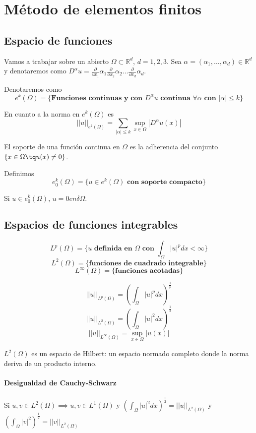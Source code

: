 \newpage
\section{Método de elementos finitos}

\subsection{Espacio de funciones}
Vamos a trabajar sobre un abierto $\Omega\subset\mathbb{R}^d$, $d=1,2,3$.
Sea $\alpha = (\alpha_1,\hdots,\alpha_d)\in\mathbb{R}^d$ y denotaremos como $D^\alpha u=\frac{\partial}{\partial x_1}\alpha_1\frac{\partial}{\partial x_2}\alpha_2\hdots\frac{\partial}{\partial x_d}\alpha_d$.

Denotaremos como 
$$e^k(\Omega) = \{\textbf{Funciones continuas y con } D^\alpha u \textbf{ continua } \forall\alpha\textbf{ con }|\alpha|\le k\}$$

En cuanto a la norma en $e^k(\Omega)$ es
$$||u||_{e^k(\Omega)} = \sum_{|\alpha|\le k}\sup_{x\in\Omega}|D^\alpha u(x)|$$

El soporte de una función continua en $\Omega$ es la adherencia del conjunto $\{x\in\Omega \tq u(x) \neq 0\}$.

Definimos
$$e_0^k (\Omega)= \{u\in e^k(\Omega) \textbf{ con soporte compacto}\}$$

Si $u\in e_0^k(\Omega)$, $u=0 en \delta\Omega$.

\subsection{Espacios de funciones integrables}
$$L^p(\Omega) = \{u\textbf{ definida en }\Omega \textbf{ con }\int_\Omega |u|^p dx < \infty \}$$
$$L^2(\Omega)=\{\textbf{funciones de cuadrado integrable}\}$$
$$L^\infty (\Omega) =\{\textbf{funciones acotadas}\}$$

$$||u||_{L^p(\Omega)} = (\int_{\Omega}|u|^p dx)^\frac{1}{p}$$
$$||u||_{L^2(\Omega)} = (\int_{\Omega}|u|^2 dx)^\frac{1}{2}$$
$$||u||_{L^\infty(\Omega)} = \sup_{x\in\Omega}|u(x)|$$

$L^2(\Omega)$ es un espacio de Hilbert: un espacio normado completo donde la norma deriva de un producto interno.

\paragraph{Desigualdad de Cauchy-Schwarz}
Si $u,v\in L^2(\Omega)\implies u,v\in L^1(\Omega)$ y $(\int_\Omega |u|^2dx)^\frac{1}{2} = ||u||_{L^2(\Omega)}$ y $(\int_\Omega|v|^2)^\frac{1}{2} = ||v||_{L^2(\Omega)}$

